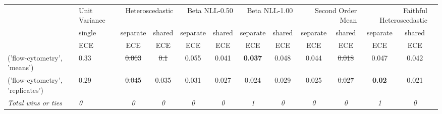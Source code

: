 \begin{tabular}{ll|c|cc|cc|cc|cc|cc}
\toprule
{} & {Unit Variance} & \multicolumn{2}{r}{Heteroscedastic} & \multicolumn{2}{r}{Beta NLL-0.50} & \multicolumn{2}{r}{Beta NLL-1.00} & \multicolumn{2}{r}{Second Order Mean} & \multicolumn{2}{r}{Faithful Heteroscedastic} \\
{} & {single} & {separate} & {shared} & {separate} & {shared} & {separate} & {shared} & {separate} & {shared} & {separate} & {shared} \\
{} & {ECE} & {ECE} & {ECE} & {ECE} & {ECE} & {ECE} & {ECE} & {ECE} & {ECE} & {ECE} & {ECE} \\
\midrule
('flow-cytometry', 'means') & 0.33 & \sout{0.063} & \sout{0.1} & 0.055 & 0.041 & \textbf{0.037} & 0.048 & 0.044 & \sout{0.018} & 0.047 & 0.042 \\
('flow-cytometry', 'replicates') & 0.29 & \sout{0.045} & 0.035 & 0.031 & 0.027 & 0.024 & 0.029 & 0.025 & \sout{0.027} & \textbf{0.02} & 0.021 \\
\textit{{Total wins or ties}} & \textit{0} & \textit{0} & \textit{0} & \textit{0} & \textit{0} & \textit{1} & \textit{0} & \textit{0} & \textit{0} & \textit{1} & \textit{0} \\
\bottomrule
\end{tabular}
